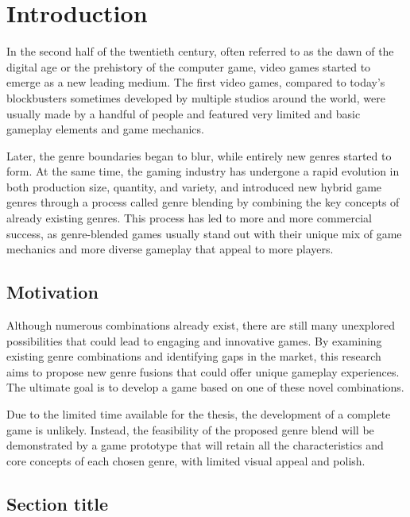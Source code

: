 \chapter{Introduction} \label{Chapter:Introduction}

In the second half of the twentieth century, often referred to as the dawn of the digital age or the prehistory of the computer game\cite{malliet2005history}, video games started to emerge as a new leading medium. The first video games, compared to today's blockbusters sometimes developed by multiple studios around the world, were usually made by a handful of people and featured very limited and basic gameplay elements and game mechanics. 


Later, the genre boundaries began to blur, while entirely new genres started to form. At the same time, the gaming industry has undergone a rapid evolution in both production size, quantity, and variety, and introduced new hybrid game genres through a process called genre blending\cite{arsenault2009} by combining the key concepts of already existing genres. This process has led to more and more commercial success, as genre-blended games usually stand out with their unique mix of game mechanics and more diverse gameplay that appeal to more players.



\section{Motivation}

Although numerous combinations already exist, there are still many unexplored possibilities that could lead to engaging and innovative games. By examining existing genre combinations and identifying gaps in the market, this research aims to propose new genre fusions that could offer unique gameplay experiences. The ultimate goal is to develop a game based on one of these novel combinations.

Due to the limited time available for the thesis, the development of a complete game is unlikely. Instead, the feasibility of the proposed genre blend will be demonstrated by a game prototype that will retain all the characteristics and core concepts of each chosen genre, with limited visual appeal and polish.



\section{Section title}


